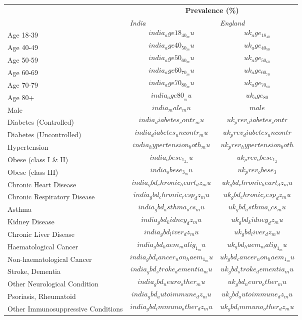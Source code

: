 
\begin{tabular}{p{6cm}p{1.1cm}p{1cm}}
& \multicolumn{2}{c}{\textbf{Prevalence (\%)  }} \\[0.5ex] & \emph{India} & \emph{England} \\[2ex]
Age 18-39 & $$india_age18_40_mu$$ & $$uk_age_18_40$$ \\[0.25ex]
Age 40-49 & $$india_age40_50_mu$$ & $$uk_age_40_50$$ \\[0.25ex]
Age 50-59 & $$india_age50_60_mu$$ & $$uk_age_50_60$$\\[0.25ex]
Age 60-69 & $$india_age60_70_mu$$ & $$uk_age_60_70$$\\[0.25ex]
Age 70-79 & $$india_age70_80_mu$$ & $$uk_age_70_80$$\\[0.25ex]
Age 80+ & $$india_age80__mu$$ & $$uk_age_80$$ \\[0.25ex]
Male & $$india_male_mu$$ & $$male$$ \\[0.25ex]
Diabetes (Controlled) & $$india_diabetes_contr_mu$$ & $$uk_prev_diabetes_contr$$ \\[0.25ex]
Diabetes (Uncontrolled) & $$india_diabetes_uncontr_mu$$ & $$uk_prev_diabetes_uncontr$$ \\[0.25ex]
Hypertension & $$india_hypertension_both_mu$$ & $$uk_prev_hypertension_both$$ \\[0.25ex]
Obese (class I \& II) & $$india_obese_1_2_mu$$ & $$uk_prev_obese_1_2$$ \\[0.25ex]
Obese (class III) & $$india_obese_3_mu$$ & $$uk_prev_obese_3$$ \\[0.25ex]
Chronic Heart Disease & $$india_gbd_chronic_heart_dz_mu$$ & $$uk_gbd_chronic_heart_dz_mu$$ \\[0.25ex]
Chronic Respiratory Disease & $$india_gbd_chronic_resp_dz_mu$$ & $$uk_gbd_chronic_resp_dz_mu$$ \\[0.25ex]
Asthma & $$india_gbd_asthma_ocs_mu$$ & $$uk_gbd_asthma_ocs_mu$$ \\[0.25ex]
Kidney Disease & $$india_gbd_kidney_dz_mu$$ & $$uk_gbd_kidney_dz_mu$$ \\[0.25ex]
Chronic Liver Disease & $$india_gbd_liver_dz_mu$$ & $$uk_gbd_liver_dz_mu$$ \\[0.25ex]
Haematological Cancer & $$india_gbd_haem_malig_1_mu$$ & $$uk_gbd_haem_malig_1_mu$$\\[0.25ex]
Non-haematological Cancer & $$india_gbd_cancer_non_haem_1_mu$$ & $$uk_gbd_cancer_non_haem_1_mu$$ \\[0.25ex]
Stroke, Dementia & $$india_gbd_stroke_dementia_mu$$ & $$uk_gbd_stroke_dementia_mu$$ \\[0.25ex]
Other Neurological Condition & $$india_gbd_neuro_other_mu$$ & $$uk_gbd_neuro_other_mu$$ \\[0.25ex]
Psoriasis, Rheumatoid & $$india_gbd_autoimmune_dz_mu$$ & $$uk_gbd_autoimmune_dz_mu$$ \\[0.25ex]
Other Immunosuppressive Conditions & $$india_gbd_immuno_other_dz_mu$$ & $$uk_gbd_immuno_other_dz_mu$$ \\[0.25ex]
\end{tabular}
